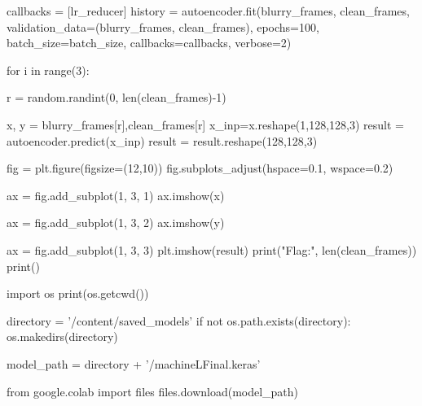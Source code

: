 callbacks = [lr_reducer]
history = autoencoder.fit(blurry_frames,
                      clean_frames,
                      validation_data=(blurry_frames, clean_frames),
                      epochs=100,
                      batch_size=batch_size,
                      callbacks=callbacks,
                      verbose=2)

for i in range(3):

    r = random.randint(0, len(clean_frames)-1)

    x, y = blurry_frames[r],clean_frames[r]
    x_inp=x.reshape(1,128,128,3)
    result = autoencoder.predict(x_inp)
    result = result.reshape(128,128,3)

    fig = plt.figure(figsize=(12,10))
    fig.subplots_adjust(hspace=0.1, wspace=0.2)

    ax = fig.add_subplot(1, 3, 1)
    ax.imshow(x)

    ax = fig.add_subplot(1, 3, 2)
    ax.imshow(y)

    ax = fig.add_subplot(1, 3, 3)
    plt.imshow(result)
print("Flag:", len(clean_frames))
print()

import os
print(os.getcwd())

directory = '/content/saved_models'
if not os.path.exists(directory):
    os.makedirs(directory)

model_path = directory + '/machineLFinal.keras'

from google.colab import files
files.download(model_path)
